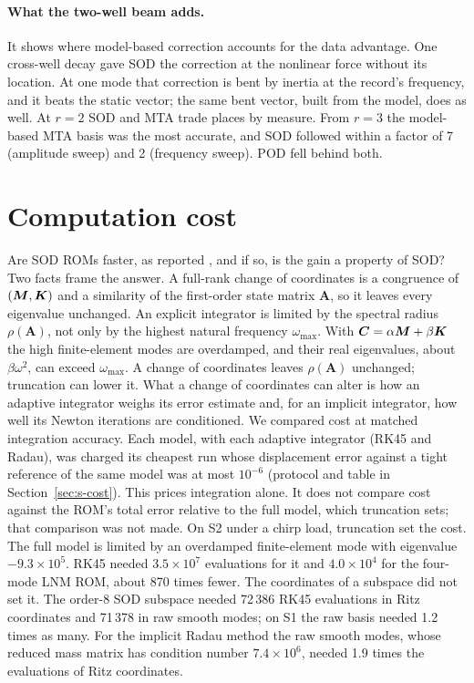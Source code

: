 \documentclass[preprint,12pt]{elsarticle}
\begin{document}
\paragraph{What the two-well beam adds.} It shows where model-based correction accounts for the data advantage. One cross-well decay gave SOD the correction at the nonlinear force without its location. At one mode that correction is bent by inertia at the record's frequency, and it beats the static vector; the same bent vector, built from the model, does as well. At $r=2$ SOD and MTA trade places by measure. From $r=3$ the model-based MTA basis was the most accurate, and SOD followed within a factor of 7 (amplitude sweep) and 2 (frequency sweep). POD fell behind both.

\section{Computation cost}\label{sec:cost}
Are SOD ROMs faster, as reported \citep{Ilbeigi2018}, and if so, is the gain a property of SOD?
Two facts frame the answer.
A full-rank change of coordinates is a congruence of $(\bm{M},\bm{K})$ and a similarity of the first-order state matrix $\bm{A}$, so it leaves every eigenvalue unchanged.
An explicit integrator is limited by the spectral radius $\rho(\bm{A})$, not only by the highest natural frequency $\omega_{\max}$. With $\bm{C}=\alpha\bm{M}+\beta\bm{K}$ the high finite-element modes are overdamped, and their real eigenvalues, about $\beta\omega^2$, can exceed $\omega_{\max}$. A change of coordinates leaves $\rho(\bm{A})$ unchanged; truncation can lower it.
What a change of coordinates can alter is how an adaptive integrator weighs its error estimate and, for an implicit integrator, how well its Newton iterations are conditioned.
We compared cost at matched integration accuracy. Each model, with each adaptive integrator (RK45 and Radau), was charged its cheapest run whose displacement error against a tight reference of the same model was at most $10^{-6}$ (protocol and table in Section~\ref{sec:s-cost}). This prices integration alone. It does not compare cost against the ROM's total error relative to the full model, which truncation sets; that comparison was not made.
On S2 under a chirp load, truncation set the cost. The full model is limited by an overdamped finite-element mode with eigenvalue $-9.3\times10^5$. RK45 needed $3.5\times10^7$ evaluations for it and $4.0\times10^4$ for the four-mode LNM ROM, about 870 times fewer.
The coordinates of a subspace did not set it. The order-8 SOD subspace needed 72\,386 RK45 evaluations in Ritz coordinates and 71\,378 in raw smooth modes; on S1 the raw basis needed 1.2 times as many. For the implicit Radau method the raw smooth modes, whose reduced mass matrix has condition number $7.4\times10^6$, needed 1.9 times the evaluations of Ritz coordinates.
\end{document}
